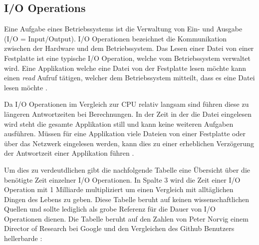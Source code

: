 \subsection{I/O Operations}
\label{subsection: io_operationen}

Eine Aufgabe eines Betriebssystems ist die Verwaltung von Ein- und Ausgabe (I/O = Input/Output). I/O Operationen bezeichnet die Kommunikation zwischen der Hardware und dem Betriebssystem. Das Lesen einer Datei von einer Festplatte ist eine typische I/O Operation, welche vom Betriebssystem verwaltet wird. Eine Applikation welche eine Datei von der Festplatte lesen möchte kann einen \emph{read} Aufruf tätigen, welcher dem Betriebssystem mitteilt, dass es eine Datei lesen möchte \cite[p. 292]{tan09}.

Da I/O Operationen im Vergleich zur CPU relativ langsam sind führen diese zu längeren Antwortzeiten bei Berechnungen.  In der Zeit in der die Datei eingelesen wird  steht die gesamte Applikation still und kann keine weiteren Aufgaben ausführen. Müssen für eine Applikation viele Dateien von einer Festplatte oder über das Netzwerk eingelesen werden, kann dies zu einer erheblichen Verzögerung der Antwortzeit einer Applikation führen \cite[p. 307]{tan09}. 

Um dies zu verdeutdlichen gibt die nachfolgende Tabelle eine Übersicht über die benötigte Zeit einzelner I/O Operationen. In Spalte 3 wird die Zeit einer I/O Operation mit 1 Milliarde multipliziert um einen Vergleich mit alltäglichen Dingen des Lebens zu geben. Diese Tabelle beruht auf keinen wissenschaftlichen Quellen und sollte lediglich als grobe Referenz für die Dauer von I/O Operationen dienen. Die Tabelle beruht auf den Zahlen von Peter Norvig \cite[]{Nor98} einem Director of Research bei Google und den Vergleichen des Github Benutzers hellerbarde \cite[]{Gis15}:

\label{subsection: i/o speed}

